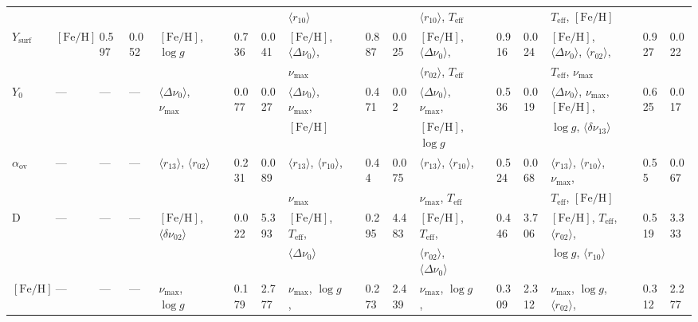 {\begin{landscape}
\begin{table}
\begin{tabular}{  l | l  l  l | l  l  l  l | l  l  l  l | l  l  l  l | l  l  l  l   }
  &  &  &  &  &  &  &  &  $\langle r_{10}\rangle$ &  &  &  & $\langle r_{10}\rangle$, $T_{\text{eff}}$ &&  & & $T_{\text{eff}}$, $[\text{Fe/H}]$ &  &  &\\[3pt]
   $Y_{\text{surf}}$ & $[\text{Fe/H}]$ & 0.597 & 0.052 & $[\text{Fe/H}]$, $\log{} g$ && 0.736 & 0.041 & $[\text{Fe/H}]$, $\langle\Delta\nu_0\rangle$, && 0.887 & 0.025 & $[\text{Fe/H}]$, $\langle\Delta\nu_0\rangle$, && 0.916 & 0.024 & $[\text{Fe/H}]$, $\langle\Delta\nu_0\rangle$, $\langle r_{02}\rangle$, && 0.927 & 0.022\\
  &  &  &  &  &  &  &  &  $\nu_{\max}$ &  &  &  & $\langle r_{02}\rangle$, $T_{\text{eff}}$ &&  & & $T_{\text{eff}}$, $\nu_{\max}$ &  &  &\\[3pt] 
   $Y_0$ & --- & --- & --- & $\langle\Delta\nu_0\rangle$, $\nu_{\max}$ && 0.077 & 0.027 & $\langle\Delta\nu_0\rangle$, $\nu_{\max}$, && 0.471 & 0.02 & $\langle\Delta\nu_0\rangle$, $\nu_{\max}$, && 0.536 & 0.019 & $\langle\Delta\nu_0\rangle$, $\nu_{\max}$, $[\text{Fe/H}]$, && 0.625 & 0.017\\
  &  &  &  &  &  &  &  &  $[\text{Fe/H}]$ &  &  &  & $[\text{Fe/H}]$, $\log{} g$ &&  & & $\log{} g$, $\langle\delta\nu_{13}\rangle$ &  &  &\\[3pt] 
    $\alpha_{\text{ov}}$ & --- & --- & --- & $\langle r_{13}\rangle$, $\langle r_{02}\rangle$ && 0.231 & 0.089 & $\langle r_{13}\rangle$, $\langle r_{10}\rangle$, && 0.44 & 0.075 & $\langle r_{13}\rangle$,  $\langle r_{10}\rangle$, && 0.524 & 0.068 & $\langle r_{13}\rangle$, $\langle r_{10}\rangle$, $\nu_{\max}$, && 0.55 & 0.067\\
  &  &  &  &  &  &  &  &  $\nu_{\max}$ &  &  &  & $\nu_{\max}$, $T_{\text{eff}}$ &&  & & $T_{\text{eff}}$, $[\text{Fe/H}]$ &  &  &\\[3pt] 
   D & --- & --- & --- & $[\text{Fe/H}]$, $\langle\delta\nu_{02}\rangle$ && 0.022 & 5.393 & $[\text{Fe/H}]$, $T_{\text{eff}}$, && 0.295 & 4.483 & $[\text{Fe/H}]$, $T_{\text{eff}}$, && 0.446 & 3.706 & $[\text{Fe/H}]$,  $T_{\text{eff}}$, $\langle r_{02}\rangle$, && 0.519 & 3.333\\
  &  &  &  &  &  &  &  &  $\langle\Delta\nu_0\rangle$ &  &  &  & $\langle r_{02}\rangle$, $\langle\Delta\nu_0\rangle$ &&  & & $\log{} g$, $\langle r_{10}\rangle$ &  &  &\\[3pt] 
  $[\text{Fe/H}]$ &--- & --- & --- & $\nu_{\max}$, $\log{} g$ && 0.179 & 2.777 & $\nu_{\max}$, $\log{} g$, && 0.273 & 2.439 & $\nu_{\max}$, $\log{} g$, && 0.309 & 2.312 & $\nu_{\max}$, $\log{} g$, $\langle r_{02}\rangle$, && 0.312 & 2.277\\

\end{tabular}
\end{table}
\end{landscape}}
